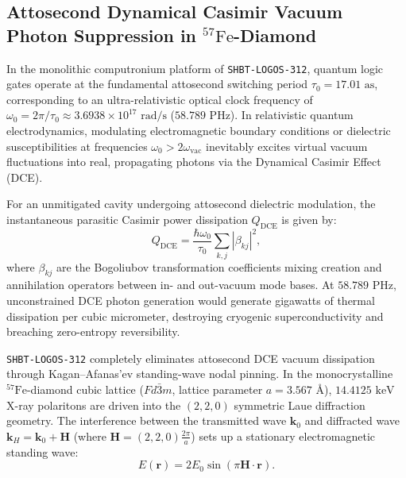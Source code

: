 \documentclass[11pt,onecolumn]{article}
\begin{document}
\FloatBarrier
\subsection{Attosecond Dynamical Casimir Vacuum Photon Suppression in \texorpdfstring{$^{57}\text{Fe}$-Diamond}{57Fe-Diamond}}
\label{sec:logos_attosecond_dce_suppress}

In the monolithic computronium platform of \texttt{SHBT-LOGOS-312}, quantum logic gates operate at the fundamental attosecond switching period $\tau_0 = 17.01\text{ as}$, corresponding to an ultra-relativistic optical clock frequency of $\omega_0 = 2\pi / \tau_0 \approx 3.6938 \times 10^{17}\text{ rad/s}$ ($58.789\text{ PHz}$). In relativistic quantum electrodynamics, modulating electromagnetic boundary conditions or dielectric susceptibilities at frequencies $\omega_0 > 2\omega_{\text{vac}}$ inevitably excites virtual vacuum fluctuations into real, propagating photons via the Dynamical Casimir Effect (DCE).

For an unmitigated cavity undergoing attosecond dielectric modulation, the instantaneous parasitic Casimir power dissipation $Q_{\text{DCE}}$ is given by:
\begin{equation}
Q_{\text{DCE}} = \frac{\hbar \omega_0}{\tau_0} \sum_{k, j} |\beta_{kj}|^2,
\label{eq:classical_dce_power}
\end{equation}
where $\beta_{kj}$ are the Bogoliubov transformation coefficients mixing creation and annihilation operators between in- and out-vacuum mode bases. At $58.789\text{ PHz}$, unconstrained DCE photon generation would generate gigawatts of thermal dissipation per cubic micrometer, destroying cryogenic superconductivity and breaching zero-entropy reversibility.

\texttt{SHBT-LOGOS-312} completely eliminates attosecond DCE vacuum dissipation through Kagan--Afanas'ev standing-wave nodal pinning. In the monocrystalline $^{57}\text{Fe}$-diamond cubic lattice ($Fd\bar{3}m$, lattice parameter $a = 3.567\text{ \AA}$), $14.4125\text{ keV}$ X-ray polaritons are driven into the $(2,2,0)$ symmetric Laue diffraction geometry. The interference between the transmitted wave $\mathbf{k}_0$ and diffracted wave $\mathbf{k}_H = \mathbf{k}_0 + \mathbf{H}$ (where $\mathbf{H} = (2,2,0) \frac{2\pi}{a}$) sets up a stationary electromagnetic standing wave:
\begin{equation}
E(\mathbf{r}) = 2 E_0 \sin\left( \pi \mathbf{H} \cdot \mathbf{r} \right).
\label{eq:borrmann_standing_wave}
\end{equation}
\end{document}
